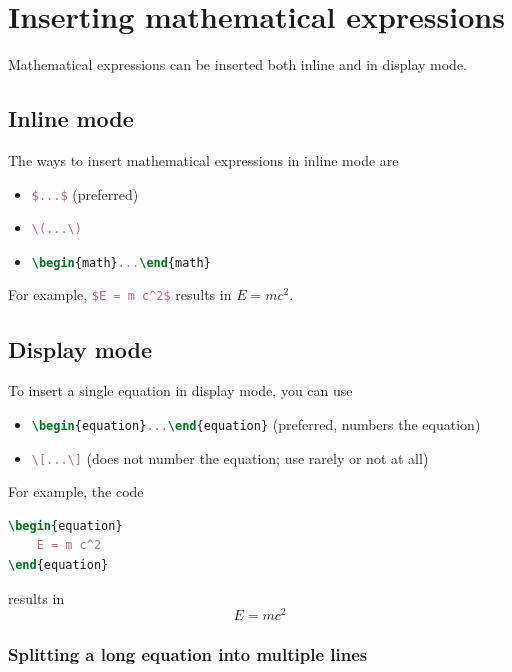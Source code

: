 \chapter{Inserting mathematical expressions}

Mathematical expressions can be inserted both inline and in display mode.

\section{Inline mode}

The ways to insert mathematical expressions in inline mode are
\begin{itemize}
    \item \lstinline[language=TeX]|$...$| (preferred)
    \item \lstinline[language=TeX]|\(...\)|
    \item \lstinline[language=TeX]|\begin{math}...\end{math}|
\end{itemize}
For example, \lstinline[language=TeX]|$E = m c^2$| results in $E = m c^2$.

\section{Display mode}

To insert a single equation in display mode, you can use
\begin{itemize}
    \item \lstinline[language=TeX]|\begin{equation}...\end{equation}| (preferred, numbers the equation)
    \item \lstinline[language=TeX]|\[...\]| (does not number the equation; use rarely or not at all)
\end{itemize}

For example, the code
\begin{lstlisting}[language=TeX]
\begin{equation}
    E = m c^2
\end{equation}
\end{lstlisting}
results in
\begin{equation}
    E = m c^2
\end{equation}

\subsection{Splitting a long equation into multiple lines}

